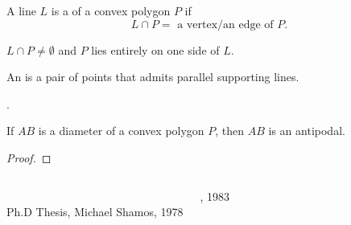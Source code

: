 \begin{frame}{}
  \begin{definition}
    A line $L$ is a  of a convex polygon $P$ if
    \[
      L \cap P = \text{ a vertex/an edge of } P.
    \]
  \end{definition}
  \pause
  \vspace{0.20cm}
  \centerline{$L \cap P \neq \emptyset$ and $P$ lies entirely on one side of $L$.}

  \pause
  \vspace{0.50cm}
  \begin{definition}[Antipodal]
    An  is a pair of points that admits parallel supporting lines.
  \end{definition}

  \pause
  \vspace{0.60cm}
  \centerline{.}
\end{frame}

\begin{frame}{}
  \begin{theorem}[]
    If $AB$ is a diameter of a convex polygon $P$, then $AB$ is an antipodal.
  \end{theorem}

  \pause
  \vspace{0.50cm}
  \begin{proof}
    \pause
  \end{proof}
\end{frame}

\begin{frame}{}
  \centerline{}
  \vspace{-0.30cm}

  \vspace{-0.30cm}
  \begin{columns}
    \pause
      \begin{center}
	 \\
	Ph.D Thesis, Michael Shamos, 1978
      \end{center}
    \pause
      \begin{center}
	, 1983
      \end{center}
  \end{columns}
\end{frame}

